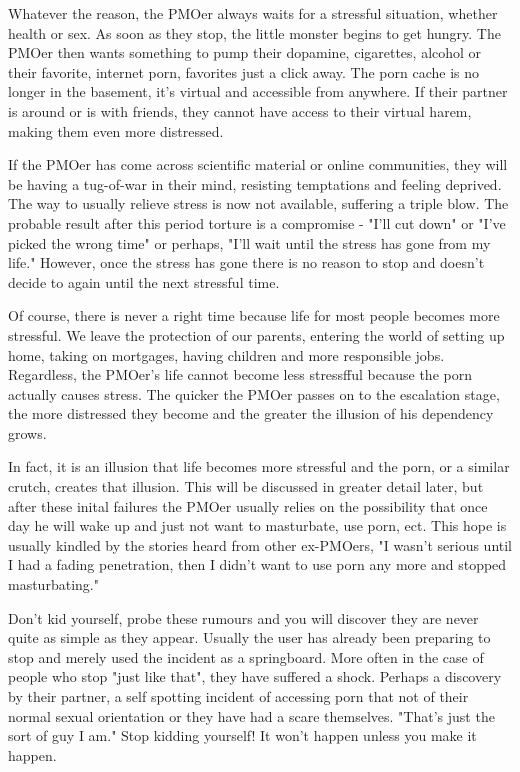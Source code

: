 Whatever the reason, the PMOer always waits for a stressful situation, whether health or sex. As soon as they stop, the little monster begins to get hungry. The PMOer then wants something to pump their dopamine, cigarettes, alcohol or their favorite, internet porn, favorites just a click away. The porn cache is no longer in the basement, it's virtual and accessible from anywhere. If their partner is around or is with friends, they cannot have access to their virtual harem, making them even more distressed.

If the PMOer has come across scientific material or online communities, they will be having a tug-of-war in their mind, resisting temptations and feeling deprived. The way to usually relieve stress is now not available, suffering a triple blow. The probable result after this period torture is a compromise - "I'll cut down" or "I've picked the wrong time" or perhaps, "I'll wait until the stress has gone from my life." However, once the stress has gone there is no reason to stop and doesn't decide to again until the next stressful time.

Of course, there is never a right time because life for most people becomes more stressful. We leave the protection of our parents, entering the world of setting up home, taking on mortgages, having children and more responsible jobs. Regardless, the PMOer's life cannot become less stressfful because the porn actually causes stress. The quicker the PMOer passes on to the escalation stage, the more distressed they become and the greater the illusion of his dependency grows.

In fact, it is an illusion that life becomes more stressful and the porn, or a similar crutch, creates that illusion. This will be discussed in greater detail later, but after these inital failures the PMOer usually relies on the possibility that once day he will wake up and just not want to masturbate, use porn, ect. This hope is usually kindled by the stories heard from other ex-PMOers, "I wasn't serious until I had a fading penetration, then I didn't want to use porn any more and stopped masturbating."

Don't kid yourself, probe these rumours and you will discover they are never quite as simple as they appear. Usually the user has already been preparing to stop and merely used the incident as a springboard. More often in the case of people who stop "just like that", they have suffered a shock. Perhaps a discovery by their partner, a self spotting incident of accessing porn that not of their normal sexual orientation or they have had a scare themselves. "That's just the sort of guy I am." Stop kidding yourself! It won't happen unless you make it happen.

